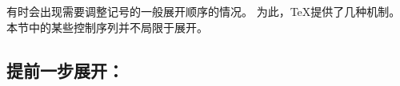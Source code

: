 \documentclass{book}
\begin{document}
有时会出现需要调整记号的一般展开顺序的情况。
为此，{\TeX}提供了几种机制。
本节中的某些控制序列并不局限于展开。

\subsection{提前一步展开：\protect{}}
\end{document}
